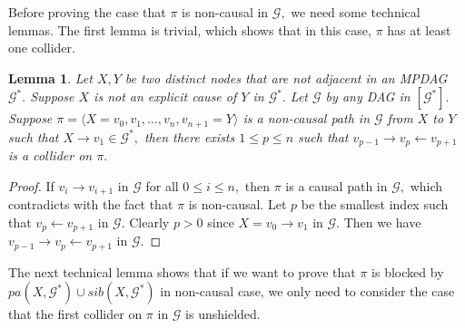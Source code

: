 \documentclass{article}
\newtheorem{lemma}{Lemma}
\begin{document}
Before proving the case that $\pi$ is non-causal in $\mathcal{G},$ we need some technical lemmas. The first lemma is trivial, which shows that in this case, $\pi$ has at least one collider.

\begin{lemma}
\label{lemma:explicit oin has collider}
Let $X,Y$ be two distinct nodes that are not adjacent in an MPDAG $\mathcal{G}^*.$ Suppose $X$ is not an explicit cause of $Y$ in $\mathcal{G}^*.$ Let $\mathcal{G}$ by any DAG in $[\mathcal{G}^*].$ Suppose $\pi=\langle X=v_0,v_1,\dots,v_n,v_{n+1}=Y\rangle$ is a non-causal path in $\mathcal{G}$ from $X$ to $Y$ such that $X\to v_1\in \mathcal{G}^*,$ then there exists $1\le p \le n$ such that $v_{p-1}\to v_p\leftarrow v_{p+1}$ is a collider on $\pi.$
\end{lemma}
\begin{proof}
If $v_i\to v_{i+1}$ in $\mathcal{G}$ for all $0\le i\le n,$ then $\pi$ is a causal path in $\mathcal{G},$ which contradicts with the fact that $\pi$ is non-causal. Let $p$ be the smallest index such that $v_p \leftarrow v_{p+1}$ in $\mathcal{G}.$ Clearly $p>0$ since $X=v_0\to v_1$ in $\mathcal{G}.$ Then we have $v_{p-1}\to v_p\leftarrow v_{p+1}$ in $\mathcal{G}.$ 
\end{proof}

The next technical lemma shows that if we want to prove that $\pi$ is blocked by $pa(X,\mathcal{G}^*)\cup sib(X,\mathcal{G}^*)$ in non-causal case, we only need to consider the case that the first collider on $\pi$ in $\mathcal{G}$ is unshielded. 
\end{document}
